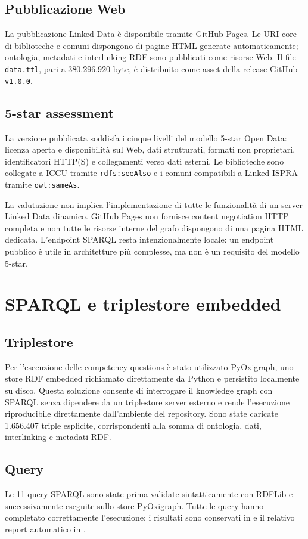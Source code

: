 \documentclass[11pt,a4paper]{article}
\begin{document}
\subsection{Pubblicazione Web}
La pubblicazione Linked Data è disponibile tramite GitHub Pages.
Le URI core di biblioteche e comuni dispongono di pagine HTML generate
automaticamente; ontologia, metadati e interlinking RDF sono pubblicati
come risorse Web. Il file \texttt{data.ttl}, pari a 380.296.920 byte,
è distribuito come asset della release GitHub \texttt{v1.0.0}.

\subsection{5-star assessment}
La versione pubblicata soddisfa i cinque livelli del modello 5-star Open
Data: licenza aperta e disponibilità sul Web, dati strutturati, formati
non proprietari, identificatori HTTP(S) e collegamenti verso dati esterni.
Le biblioteche sono collegate a ICCU tramite \texttt{rdfs:seeAlso} e i
comuni compatibili a Linked ISPRA tramite \texttt{owl:sameAs}.

La valutazione non implica l'implementazione di tutte le funzionalità di un
server Linked Data dinamico. GitHub Pages non fornisce content negotiation
HTTP completa e non tutte le risorse interne del grafo dispongono di una
pagina HTML dedicata. L'endpoint SPARQL resta intenzionalmente locale:
un endpoint pubblico è utile in architetture più complesse, ma non è un
requisito del modello 5-star.

\section{SPARQL e triplestore embedded}
\subsection{Triplestore}
Per l'esecuzione delle competency questions è stato utilizzato PyOxigraph,
uno store RDF embedded richiamato direttamente da Python e persistito
localmente su disco. Questa soluzione consente di interrogare il knowledge
graph con SPARQL senza dipendere da un triplestore server esterno e rende
l'esecuzione riproducibile direttamente dall'ambiente del repository.
Sono state caricate 1.656.407 triple esplicite, corrispondenti alla somma
di ontologia, dati, interlinking e metadati RDF.
\subsection{Query}
Le 11 query SPARQL sono state prima validate sintatticamente con RDFLib
e successivamente eseguite sullo store PyOxigraph. Tutte le query hanno
completato correttamente l'esecuzione; i risultati sono conservati in
 e il relativo report automatico in
.
\end{document}
